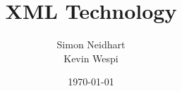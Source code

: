 \titlehead{Hochschule Luzern \\ 
	Technik \& Architektur}
\subject{Zusammenfassung}
\title{XML Technology}
\subtitle{}
\author{Simon Neidhart \\ Kevin Wespi \\}
\date{\today}

\maketitle